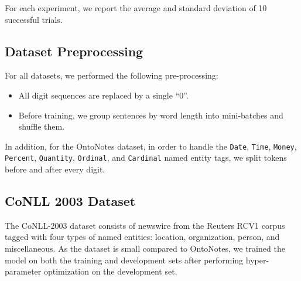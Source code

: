 \documentclass[11pt,letterpaper]{article}
\begin{document}
For each experiment, we report the average and standard deviation of 10 successful trials.

\subsection{Dataset Preprocessing}

For all datasets, we performed the following pre-processing:
\begin{itemize}
\item All digit sequences are replaced by a single ``0''.
\item Before training, we group sentences by word length
into mini-batches and shuffle them.
\end{itemize}
In addition, for the OntoNotes dataset, in order to handle the {\tt Date}, {\tt Time}, {\tt Money}, {\tt Percent}, {\tt Quantity}, {\tt Ordinal}, and {\tt Cardinal} named entity tags, we split tokens before and after every digit.%

\subsection{CoNLL 2003 Dataset}

The CoNLL-2003 dataset \cite{conll2003} consists of newswire from the Reuters RCV1 corpus tagged with four types of named entities: location, organization, person, and miscellaneous. As the dataset is small compared to OntoNotes, we trained the model on both the training and development sets after performing hyper-parameter optimization on the development set.


\end{document}

